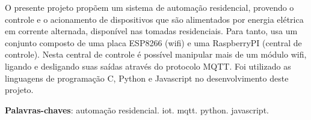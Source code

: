 \documentclass[
	12pt,				%
	openright,			%
	oneside,			%
	a4paper,			%
	chapter=TITLE,		%
	english,			%
	french,				%
	spanish,			%
	brazil,				%
	]{abntex2}
\begin{document}
\frenchspacing 


\imprimircapa

\imprimirfolhaderosto*


\begin{resumo}
O presente projeto propõem um sistema de automação residencial, provendo o controle e o acionamento de dispositivos que são alimentados por energia elétrica em corrente alternada, disponível nas tomadas residenciais. Para tanto, usa um conjunto composto de uma placa ESP8266 (wifi) e uma RaspberryPI (central de controle). Nesta central de controle é possível manipular mais de um módulo wifi, ligando e desligando suas saídas através do protocolo MQTT. Foi utilizado as linguagens de programação C, Python e Javascript no desenvolvimento deste projeto.

 \vspace{\onelineskip}
    
 \noindent
 \textbf{Palavras-chaves}: automação residencial. iot. mqtt. python. javascript.
\end{resumo}

\listoffigures*
\cleardoublepage

\listoftables*
\cleardoublepage
\end{document}
